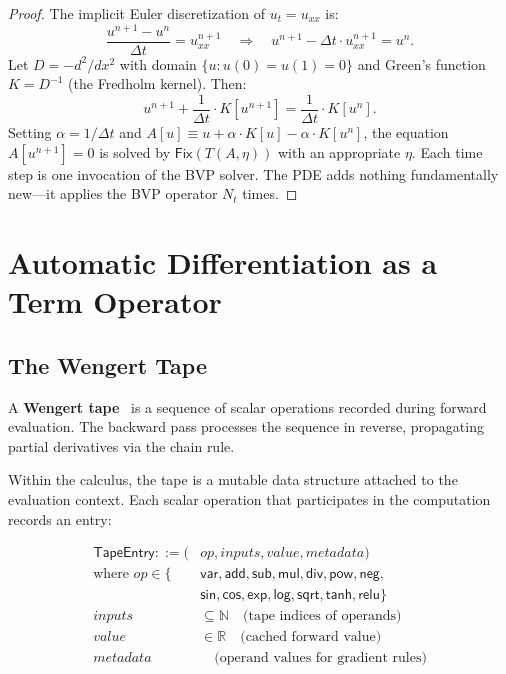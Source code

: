 \documentclass{lmcs}
\theoremstyle{plain}
\theoremstyle{definition}
\newcommand{\NN}{\mathbb{N}}
\newcommand{\RR}{\mathbb{R}}
\newcommand{\fix}{\mathsf{Fix}}
\begin{document}
\begin{proof}
The implicit Euler discretization of $u_t = u_{xx}$ is:
\[
\frac{u^{n+1} - u^n}{\Delta t} = u^{n+1}_{xx}
\quad\Longrightarrow\quad
u^{n+1} - \Delta t \cdot u^{n+1}_{xx} = u^n.
\]
Let $D = -d^2/dx^2$ with domain $\{u : u(0) = u(1) = 0\}$ and Green's
function $K = D^{-1}$ (the Fredholm kernel). Then:
\[
u^{n+1} + \frac{1}{\Delta t} \cdot K[u^{n+1}] = \frac{1}{\Delta t} \cdot
K[u^n].
\]
Setting $\alpha = 1/\Delta t$ and
$A[u] \equiv u + \alpha \cdot K[u] - \alpha \cdot K[u^n]$,
the equation $A[u^{n+1}] = 0$ is solved by
$\fix(T(A, \eta))$ with an appropriate $\eta$. Each time step is one
invocation of the BVP solver. The PDE adds nothing fundamentally new---it
applies the BVP operator $N_t$ times.
\end{proof}

\section{Automatic Differentiation as a Term Operator}\label{sec:ad}

\subsection{The Wengert Tape}

A \textbf{Wengert tape}~\cite{wengert1964} is a sequence of scalar
operations recorded during forward evaluation. The backward pass processes
the sequence in reverse, propagating partial derivatives via the chain rule.

Within the calculus, the tape is a mutable data structure attached to the
evaluation context. Each scalar operation that participates in the
computation records an entry:

\begin{defi}
\begin{align*}
\mathsf{TapeEntry} ::= (&op, inputs, value, metadata) \\
\text{where } op \in \{&\mathsf{var}, \mathsf{add}, \mathsf{sub},
  \mathsf{mul}, \mathsf{div}, \mathsf{pow}, \mathsf{neg}, \\
  &\mathsf{sin}, \mathsf{cos}, \mathsf{exp}, \mathsf{log},
  \mathsf{sqrt}, \mathsf{tanh}, \mathsf{relu}\} \\
inputs &\subseteq \NN \quad\text{(tape indices of operands)} \\
value &\in \RR \quad\text{(cached forward value)} \\
metadata &\quad\text{(operand values for gradient rules)}
\end{align*}
\end{defi}
\end{document}
